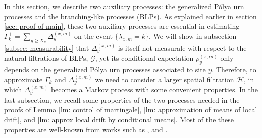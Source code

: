 \documentclass[EJP]{ejpecp} %
\begin{document}
In this section, we describe two auxiliary processes: the generalized P\'{o}lya urn processes and the branching-like processes (BLPs). As explained earlier in section \ref{sec: proof of main}, these two auxiliary processes are essential in estimating $\Gamma_k^+= \sum_{y\geq X_k} \Delta_{y}^{(x,m)}$ on the event $\{\lambda_{x,m} = k\}$. We will show in subsection \ref{subsec: measurability} that $\Delta^{(x,m)}_{y}$ is itself not measurale with respect to the natural filtrations of BLPs, $\mathcal{G}$, yet its conditional expectation $\rho^{(x,m)}_{y}$ only depends on the generalized P\'{o}lya urn processes associated to site $y$. Therefore, to approximate $\Gamma_k$ and $\Delta_{y}^{(x,m)}$ we need to consider a larger spatial filtration $\mathcal{H}$, in which $\Delta^{(x,m)}_{y}$ becomes a Markov process with some convenient properties. In the last subsection, we recall some properties of the two processes needed in the proofs of Lemma \ref{lm: control of martingale}, \ref{lm: approximation of means of local drift}, and \ref{lm: approx local drift by conditional means}. Most of the these properties are well-known from works such as \cite{T96}, \cite{KP16} and \cite{KMP23}. 

\end{document}
